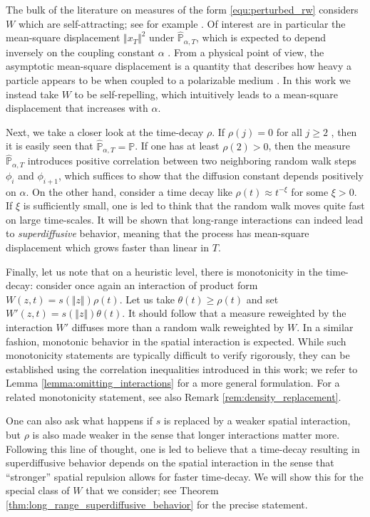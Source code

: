 \documentclass[reqno,11pt]{amsart}
\newcommand{\1}{\mathds{1}}
\theoremstyle{plain}
\theoremstyle{definition}
\numberwithin{equation}{section}
\newcommand{\bbP}{{\mathbb P}}
\newcommand{\bbPh}{\hat{\bbP}}
\begin{document}
The bulk of the literature on measures of the form \eqref{equ:perturbed_rw} considers $W$ which are self-attracting; see for example \cite{BrySla95, Bolthausen1997, Bo02,OsSp99,BePo23,BaMuSeVa23,Se24,BeSchSe25,BeSchSe24}. Of interest are in particular the mean-square displacement $ \Vert x_T \Vert^2$ under $\bbPh_{\alpha,T}$, which is expected to depend inversely on the coupling constant $\alpha$ \cite{BePo23,BaMuSeVa23,Se24,BeSchSe25}. From a physical point of view, the asymptotic mean-square displacement is a quantity that describes how heavy a particle appears to be when coupled to a polarizable medium \cite{Sp87,DySp20}. 
In this work we instead take $W$ to be self-repelling, which intuitively leads to a mean-square displacement that increases with $\alpha$. 

Next, we take a closer look at the time-decay $\rho$. If $\rho(j) = 0$ for all $j \ge 2$
, then it is easily seen that $\bbPh_{\alpha,T} = \bbP$. If one has at least $\rho(2) > 0$, then the measure $\bbPh_{\alpha,T}$ introduces positive correlation between two neighboring random walk steps $\phi_i$ and $\phi_{i+1}$, which suffices to show that the diffusion constant depends positively on $\alpha$. On the other hand, consider a time decay like $\rho(t) \approx t^{-\xi}$ for some $\xi > 0$. If $\xi$ is sufficiently small, one is led to think that the random walk moves quite fast on large time-scales. It will be shown that long-range interactions can indeed lead to \textit{superdiffusive} behavior, meaning that the process has mean-square displacement which grows faster than linear in $T$.

Finally, let us note that on a heuristic level, there is monotonicity in the time-decay: consider once again an interaction of product form $W(z,t) = s(\Vert z \Vert) \rho(t)$. Let us take $\theta(t) \ge \rho(t)$ and set $W'(z,t) = s( \Vert z \Vert) \theta(t)$. It should follow that a measure reweighted by the interaction $W'$ diffuses more than a random walk reweighted by $W$. In a similar fashion, monotonic behavior in the spatial interaction is expected. While such monotonicity statements are typically difficult to verify rigorously, they can be established using the correlation inequalities introduced in this work; we refer to Lemma \ref{lemma:omitting_interactions} for a more general formulation. For a related monotonicity statement, see also Remark \ref{rem:density_replacement}.

One can also ask what happens if $s$ is replaced by a weaker spatial interaction, but $\rho$ is also made weaker in the sense that longer interactions matter more. Following this line of thought, one is led to believe that a time-decay resulting in superdiffusive behavior depends on the spatial interaction in the sense that ``stronger'' spatial repulsion allows for faster time-decay. We will show this for the special class of $W$ that we consider; see Theorem \ref{thm:long_range_superdiffusive_behavior} for the precise statement.
\end{document}
